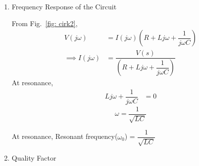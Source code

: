 \documentclass[journal,12pt,twocolumn]{IEEEtran}
\newcommand\figref{Fig.~\ref}
\theoremstyle{remark}
\begin{document}
\begin{enumerate}
\item {Frequency Response of the Circuit}


From \figref{fig: cirk2},
\begin{align}
   V(j\omega) &= I(j\omega)\left(R + Lj\omega + \dfrac{1}{j\omega C}\right)\\
    \implies I(j\omega) &= \dfrac{V(s)}{\left(R + Lj\omega + \dfrac{1}{j\omega C}\right)}\label{eq: 4}
\end{align}
At resonance,
\begin{align}
    Lj\omega + \dfrac{1}{j\omega C} &= 0
\end{align}
\begin{equation}
    \omega = \dfrac{1}{\sqrt{LC}}
\end{equation}

At resonance, Resonant frequency($\omega_0$) = $\dfrac{1}{\sqrt{LC}}$
\item{Quality Factor}


\end{enumerate}
\end{document}

